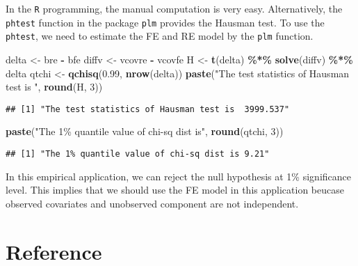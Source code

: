 \documentclass[
  12pt,
]{article}
\newenvironment{Shaded}{\begin{snugshade}}{\end{snugshade}}
\newcommand{\DecValTok}[1]{\textcolor[rgb]{0.00,0.00,0.81}{#1}}
\newcommand{\FloatTok}[1]{\textcolor[rgb]{0.00,0.00,0.81}{#1}}
\newcommand{\KeywordTok}[1]{\textcolor[rgb]{0.13,0.29,0.53}{\textbf{#1}}}
\newcommand{\NormalTok}[1]{#1}
\newcommand{\OperatorTok}[1]{\textcolor[rgb]{0.81,0.36,0.00}{\textbf{#1}}}
\newcommand{\StringTok}[1]{\textcolor[rgb]{0.31,0.60,0.02}{#1}}
\begin{document}
In the \texttt{R} programming, the manual computation is very easy.
Alternatively, the \texttt{phtest} function in the package \texttt{plm} provides the Hausman test.
To use the \texttt{phtest}, we need to estimate the FE and RE model by the \texttt{plm} function.

\begin{Shaded}
\begin{Highlighting}[]
\NormalTok{delta \textless{}{-}}\StringTok{ }\NormalTok{bre }\OperatorTok{{-}}\StringTok{ }\NormalTok{bfe}
\NormalTok{diffv \textless{}{-}}\StringTok{ }\NormalTok{vcovre }\OperatorTok{{-}}\StringTok{ }\NormalTok{vcovfe}
\NormalTok{H \textless{}{-}}\StringTok{ }\KeywordTok{t}\NormalTok{(delta) }\OperatorTok{\%*\%}\StringTok{ }\KeywordTok{solve}\NormalTok{(diffv) }\OperatorTok{\%*\%}\StringTok{ }\NormalTok{delta}
\NormalTok{qtchi \textless{}{-}}\StringTok{ }\KeywordTok{qchisq}\NormalTok{(}\FloatTok{0.99}\NormalTok{, }\KeywordTok{nrow}\NormalTok{(delta))}
\KeywordTok{paste}\NormalTok{(}\StringTok{"The test statistics of Hausman test is "}\NormalTok{, }\KeywordTok{round}\NormalTok{(H, }\DecValTok{3}\NormalTok{))}
\end{Highlighting}
\end{Shaded}

\begin{verbatim}
## [1] "The test statistics of Hausman test is  3999.537"
\end{verbatim}

\begin{Shaded}
\begin{Highlighting}[]
\KeywordTok{paste}\NormalTok{(}\StringTok{"The 1\% quantile value of chi{-}sq dist is"}\NormalTok{, }\KeywordTok{round}\NormalTok{(qtchi, }\DecValTok{3}\NormalTok{))}
\end{Highlighting}
\end{Shaded}

\begin{verbatim}
## [1] "The 1% quantile value of chi-sq dist is 9.21"
\end{verbatim}

In this empirical application, we can reject the null hypothesis at 1\% significance level.
This implies that we should use the FE model in this application
beucase observed covariates and unobserved component are not independent.

\hypertarget{reference}{%
\section{Reference}\label{reference}}
\end{document}
